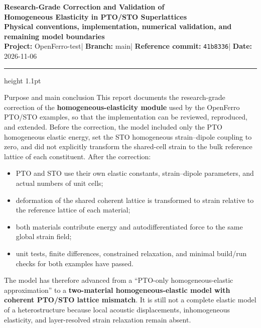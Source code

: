 \documentclass[11pt,a4paper]{article}
\begin{document}
\begin{center}
  {\LARGE\bfseries\color{Navy}Research-Grade Correction and Validation of\\[0.12em]
  Homogeneous Elasticity in PTO/STO Superlattices}\\[0.42em]
  {\large\bfseries\color{Blue}Physical conventions, implementation, numerical validation, and remaining model boundaries}\\[0.65em]
  {\small
    \textbf{Project:} OpenFerro-test\quad|\quad
    \textbf{Branch:} main\quad|\quad
    \textbf{Reference commit:} \texttt{41b8336}\quad|\quad
    \textbf{Date:} 2026-11-06
  }
\end{center}
\vspace{-0.15em}
\hrule height 1.1pt
\vspace{0.75em}

\begin{keybox}{Purpose and main conclusion}
This report documents the research-grade correction of the \textbf{homogeneous-elasticity module} used by the OpenFerro PTO/STO examples, so that the implementation can be reviewed, reproduced, and extended. Before the correction, the model included only the PTO homogeneous elastic energy, set the STO homogeneous strain--dipole coupling to zero, and did not explicitly transform the shared-cell strain to the bulk reference lattice of each constituent. After the correction:
\begin{itemize}
  \item PTO and STO use their own elastic constants, strain--dipole parameters, and actual numbers of unit cells;
  \item deformation of the shared coherent lattice is transformed to strain relative to the reference lattice of each material;
  \item both materials contribute energy and autodifferentiated force to the same global strain field;
  \item unit tests, finite differences, constrained relaxation, and minimal build/run checks for both examples have passed.
\end{itemize}
The model has therefore advanced from a ``PTO-only homogeneous-elastic approximation'' to a \textbf{two-material homogeneous-elastic model with coherent PTO/STO lattice mismatch}. It is still not a complete elastic model of a heterostructure because local acoustic displacements, inhomogeneous elasticity, and layer-resolved strain relaxation remain absent.
\end{keybox}
\end{document}
